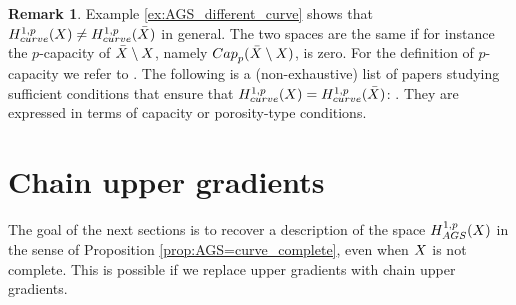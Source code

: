 \documentclass[12pt]{amsart}
\newcommand{\X}{{\rm X}}
\theoremstyle{definition}
\newtheorem{remark}[theorem]{Remark}
\newcommand{\HH}[2]{H^{1,#1}_{{\rm #2}}}
\begin{document}
\begin{remark}
    Example \ref{ex:AGS_different_curve} shows that $\HH{p}{curve}(\X) \neq \HH{p}{curve}(\bar{\X})$ in general. The two spaces are the same if for instance the $p$-capacity of $\bar{\X}\setminus \X$, namely ${\rm Cap}_p(\bar{\X}\setminus \X)$, is zero. For the definition of $p$-capacity we refer to \cite[Chapter 7]{HKST15}. The following is a (non-exhaustive) list of papers studying sufficient conditions that ensure that $\HH{p}{curve}(\X) = \HH{p}{curve}(\bar{\X})$: \cite{HKST15,Koskela99,KoskelaShanmuTuominen2000,Lahti2023}. They are expressed in terms of capacity or porosity-type conditions.
\end{remark}

\section{Chain upper gradients}
%
\label{sec:chain_upper_gradients}
The goal of the next sections is to recover a description of the space $\HH{p}{AGS}(\X)$ in the sense of Proposition \ref{prop:AGS=curve_complete}, even when $\X$ is not complete. This is possible if we replace upper gradients with chain upper gradients.
\end{document}
